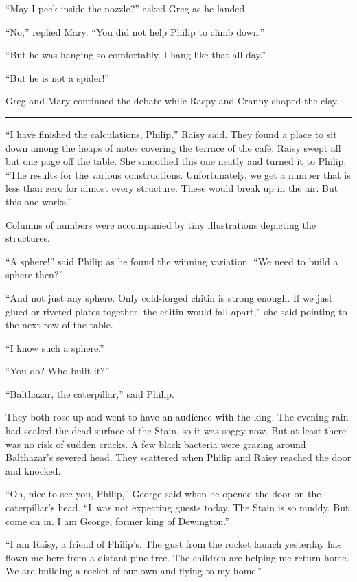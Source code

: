 \documentclass[10pt]{memoir}
\renewcommand{\pfbreakdisplay}{\bigskip \ding{166} \bigskip}
\newcommand{\secbreak}{\fancybreak{\pfbreakdisplay}}
\begin{document}
``May I peek inside the nozzle?'' asked Greg as he landed.

``No,'' replied Mary. ``You did not help Philip to climb down.''

``But he was hanging so comfortably. I hang like that all day.''

``But he is not a spider!''

Greg and Mary continued the debate while Raspy and Cranny shaped the clay.

\secbreak

``I have finished the calculations, Philip,'' Raisy said. They found a place to
sit down among the heaps of notes covering the terrace of the café. Raisy swept
all but one page off the table. She smoothed this one neatly and turned it to
Philip. ``The results for the various constructions. Unfortunately, we get a
number that is less than zero for almost every structure. These would break up
in the air. But this one works.''

Columns of numbers were accompanied by tiny illustrations depicting the
structures.

``A sphere!'' said Philip as he found the winning variation. ``We need to build
a sphere then?''

``And not just any sphere. Only cold-forged chitin is strong enough. If we just
glued or riveted plates together, the chitin would fall apart,'' she said
pointing to the next row of the table.

``I know such a sphere.''

``You do? Who built it?''

``Balthazar, the caterpillar,'' said Philip.

They both rose up and went to have an audience with the king. The evening rain
had soaked the dead surface of the Stain, so it was soggy now. But at least
there was no risk of sudden cracks. A few black bacteria were grazing around
Balthazar's severed head. They scattered when Philip and Raisy reached the door
and knocked.

``Oh, nice to see you, Philip,'' George said when he opened the door on the
caterpillar's head. ``I~was not expecting guests today. The Stain is so muddy.
But come on in. I am George, former king of Dewington.''

``I am Raisy, a friend of Philip's. The gust from the rocket launch yesterday
has flown me here from a distant pine tree. The children are helping me return
home. We are building a rocket of our own and flying to my home.''
\end{document}
